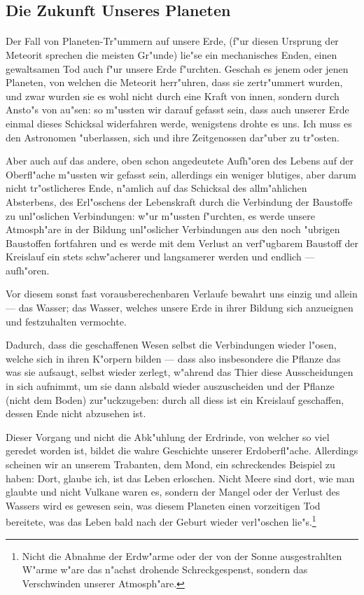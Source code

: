 \documentclass[a4paper, 11pt, oneside]{article}
\begin{document}
\subsection{Die Zukunft Unseres Planeten}
\paragraph{}
Der Fall von Planeten-Tr"ummern auf unsere Erde, (f"ur diesen Ursprung der Meteorit sprechen die meisten Gr"unde) lie"se ein mechanisches Enden, einen gewaltsamen Tod auch f"ur unsere Erde f"urchten. Geschah es jenem oder jenen Planeten, von welchen die Meteorit herr"uhren, dass sie zertr"ummert wurden, und zwar wurden sie es wohl nicht durch eine Kraft von innen, sondern durch Ansto"s von au"sen: so m"ussten wir darauf gefasst sein, dass auch unserer Erde einmal dieses Schicksal widerfahren werde, wenigstens drohte es uns. Ich muss es den Astronomen "uberlassen, sich und ihre Zeitgenossen dar"uber zu tr"osten.

Aber auch auf das andere, oben schon angedeutete Aufh"oren des Lebens auf der Oberfl"ache m"ussten wir gefasst sein, allerdings ein weniger blutiges, aber darum nicht tr"ostlicheres Ende, n"amlich auf das Schicksal des allm"ahlichen Absterbens, des Erl"oschens der Lebenskraft durch die Verbindung der Baustoffe zu unl"oslichen Verbindungen: w"ur m"ussten f"urchten, es werde unsere Atmosph"are in der Bildung unl"oslicher Verbindungen aus den noch "ubrigen Baustoffen fortfahren und es werde mit dem Verlust an verf"ugbarem Baustoff der Kreislauf ein stets schw"acherer und langsamerer werden und endlich --- aufh"oren.

Vor diesem sonst fast vorausberechenbaren Verlaufe bewahrt uns einzig und allein --- das Wasser; das Wasser, welches unsere Erde in ihrer Bildung sich anzueignen und festzuhalten vermochte.

Dadurch, dass die geschaffenen Wesen selbst die Verbindungen wieder l"osen, welche sich in ihren K"orpern bilden --- dass also insbesondere die Pflanze das was sie aufsaugt, selbst wieder zerlegt, w"ahrend das Thier diese Ausscheidungen in sich aufnimmt, um sie dann alsbald wieder auszuscheiden und der Pflanze (nicht dem Boden) zur"uckzugeben: durch all diess ist ein Kreislauf geschaffen, dessen Ende nicht abzusehen ist.

Dieser Vorgang und nicht die Abk"uhlung der Erdrinde, von welcher so viel geredet worden ist, bildet die wahre Geschichte unserer Erdoberfl"ache. Allerdings scheinen wir an unserem Trabanten, dem Mond, ein schreckendes Beispiel zu haben: Dort, glaube ich, ist das Leben erloschen. Nicht Meere sind dort, wie man glaubte und nicht Vulkane waren es, sondern der Mangel oder der Verlust des Wassers wird es gewesen sein, was diesem Planeten einen vorzeitigen Tod bereitete, was das Leben bald nach der Geburt wieder verl"oschen lie"s.\footnote{Nicht die Abnahme der Erdw"arme oder der von der Sonne ausgestrahlten W"arme w"are das n"achst drohende Schreckgespenst, sondern das Verschwinden unserer Atmosph"are.}
\end{document}
